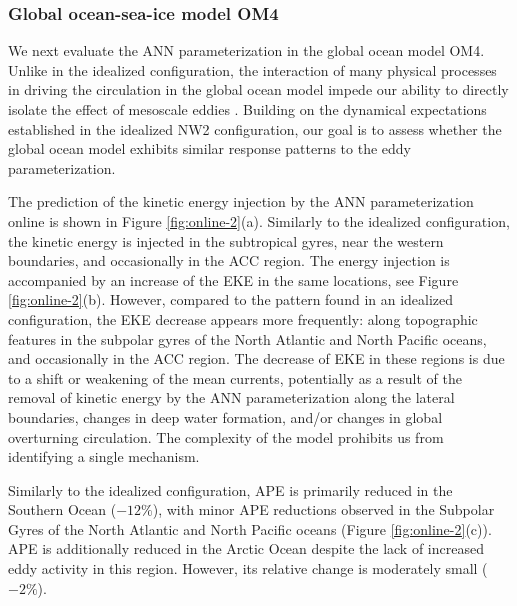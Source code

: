 \documentclass[draft]{agujournal2019}
\begin{document}
\subsubsection{Global ocean-sea-ice model OM4}
We next evaluate the ANN parameterization in the global ocean model OM4. Unlike in the idealized configuration, the interaction of many physical processes in driving the circulation in the global ocean model impede our ability to directly isolate the effect of mesoscale eddies \cite{ferrari2009ocean, levy2010modifications}. Building on the dynamical expectations established in the idealized NW2 configuration, our goal is to assess whether the global ocean model exhibits similar response patterns to the eddy parameterization.

The prediction of the kinetic energy injection by the ANN parameterization online is shown in Figure \ref{fig:online-2}(a). Similarly to the idealized configuration, the kinetic energy is injected in the subtropical gyres, %
near the western boundaries, and occasionally in the ACC region. The energy injection is accompanied by an increase of the EKE in the same locations, see Figure \ref{fig:online-2}(b). However, compared to the pattern found in an idealized configuration, the EKE decrease appears more frequently: along topographic features in the subpolar gyres of the North Atlantic and North Pacific oceans, and occasionally in the ACC region. The decrease of EKE in these regions is due to a shift or weakening of the mean currents, potentially as a result of the removal of kinetic energy by the ANN parameterization along the lateral boundaries, changes in deep water formation, and/or changes in global overturning circulation. The complexity of the model prohibits us from identifying a single mechanism. 

Similarly to the idealized configuration, APE is primarily reduced in the Southern Ocean ($-12 \%$), with minor APE reductions observed in the Subpolar Gyres of the North Atlantic and North Pacific oceans (Figure \ref{fig:online-2}(c)). APE is additionally reduced in the Arctic Ocean despite the lack of increased eddy activity in this region. However, its relative change is moderately small ($-2 \%$).
\end{document}

